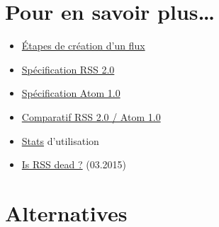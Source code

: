 \begin{otherlanguage}{english}

\begin{Shaded}
\begin{Highlighting}[]
  
 \KeywordTok{/>} 

 \KeywordTok{/>}

\end{Highlighting}
\end{Shaded}

\end{otherlanguage}

\hypertarget{pour-en-savoir-plus}{%
\section{Pour en savoir plus\ldots{}}\label{pour-en-savoir-plus}}

\begin{itemize}
\tightlist
\item
  \href{http://www.xul.fr/xml-rss.html}{Étapes de création d'un flux}
\item
  \href{http://www.rssboard.org/rss-specification}{Spécification RSS
  2.0}
\item
  \href{https://tools.ietf.org/html/rfc4287}{Spécification Atom 1.0}
\item
  \href{http://www.differencebetween.info/difference-between-rss-and-atom}{Comparatif
  RSS 2.0 / Atom 1.0}
\item
  \href{https://trends.builtwith.com/feeds}{Stats} d'utilisation
\item
  \href{http://www.makeuseof.com/tag/rss-dead-look-numbers/}{Is RSS dead
  ?} (03.2015)
\end{itemize}

\hypertarget{alternatives}{%
\section{Alternatives}\label{alternatives}}

